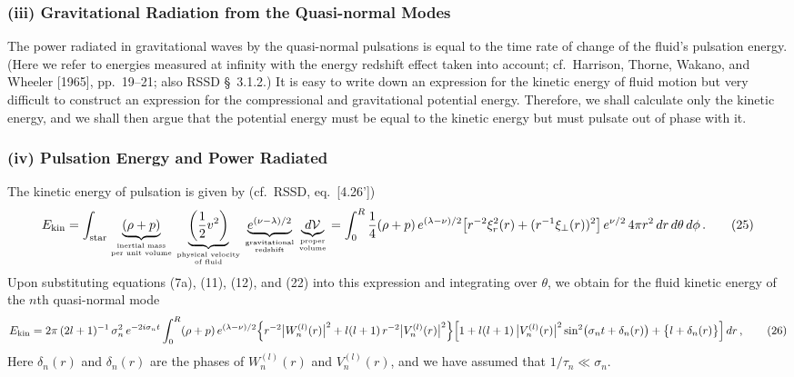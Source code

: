 \subsubsection{(iii) Gravitational Radiation from the Quasi-normal Modes}

The power radiated in gravitational waves by the quasi-normal pulsations is equal
to the time rate of change of the fluid's pulsation energy. (Here we refer to energies
measured at infinity with the energy redshift effect taken into account; cf.\ Harrison,
Thorne, Wakano, and Wheeler [1965], pp.\ 19--21; also RSSD \S~3.1.2.) It is easy to
write down an expression for the kinetic energy of fluid motion but very difficult to
construct an expression for the compressional and gravitational potential energy.
Therefore, we shall calculate only the kinetic energy, and we shall then argue that the
potential energy must be equal to the kinetic energy but must pulsate out of phase with
it.

\subsubsection{(iv) Pulsation Energy and Power Radiated}

The kinetic energy of pulsation is given by (cf.\ RSSD, eq.\ [4.26'])
%
\begin{equation}
E_{\rm kin} = \int_{\rm star}
\underbrace{\left(\rho + p\right)}_{\text{inertial mass}\atop\text{per unit volume}}
\underbrace{\left(\frac{1}{2}v^2\right)}_{\text{physical velocity}\atop\text{of fluid}}
\underbrace{e^{(\nu - \lambda)/2}}_{\text{gravitational}\atop\text{redshift}}
\underbrace{d\mathcal{V}}_{\text{proper}\atop\text{volume}}
= \int_0^R \frac{1}{4}(\rho+p)\,e^{(\lambda-\nu)/2}\bigl[r^{-2}\xi_r^2(r) + (r^{-1}\xi_\perp(r))^2\bigr]\,e^{\nu/2}\,4\pi r^2\,dr\,d\theta\,d\phi \,.
\tag{25}
\end{equation}
%
Upon substituting equations (7a), (11), (12), and (22) into this expression and
integrating over $\theta$, we obtain for the fluid kinetic energy of the $n$th quasi-normal mode
%
\begin{equation}
E_{\rm kin} = 2\pi\,(2l+1)^{-1}\,\sigma_n^2\,e^{-2i\sigma_n t}
\int_0^R (\rho+p)\,e^{(\lambda-\nu)/2}
\Bigl\{
r^{-2}\bigl|W_n^{(l)}(r)\bigr|^2
+ l(l+1)\,r^{-2}\bigl|V_n^{(l)}(r)\bigr|^2
\Bigr\}
\Bigl[
1 + l(l+1)\,\bigl|V_n^{(l)}(r)\bigr|^2
\sin^2\bigl(\sigma_n t + \delta_n(r)\bigr)
+ \bigl\{l + \delta_n(r)\bigr\}
\Bigr]\,dr \,,
\tag{26}
\end{equation}
%
Here $\delta_n(r)$ and $\delta_n(r)$ are the phases of $W_n^{(l)}(r)$ and $V_n^{(l)}(r)$, and we have assumed that
$1/\tau_n \ll \sigma_n$.

